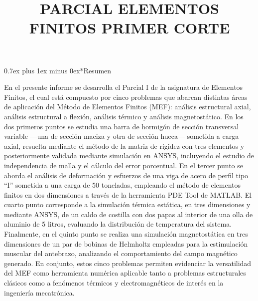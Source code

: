 \documentclass[conference]{IEEEtran}
\makeatletter
\def\section{\@startsection{section}{1}{\z@}{1.5ex plus 1.5ex minus 0.5ex}%
{0.7ex plus 1ex minus 0ex}{\normalfont\large\bfseries\centering\scshape}}%
\makeatother
\begin{document}
\title{
PARCIAL ELEMENTOS FINITOS PRIMER CORTE
}

\author{

\and
{}
\and
{}
}

\maketitle
\thispagestyle{headings}

\section*{Resumen}

En el presente informe se desarrolla el Parcial I de la asignatura de Elementos Finitos, el cual está compuesto por cinco problemas que abarcan distintas áreas de aplicación del Método de Elementos Finitos (MEF): análisis estructural axial, análisis estructural a flexión, análisis térmico y análisis magnetostático. En los dos primeros puntos se estudia una barra de hormigón de sección transversal variable —una de sección maciza y otra de sección hueca— sometida a carga axial, resuelta mediante el método de la matriz de rigidez con tres elementos y posteriormente validada mediante simulación en ANSYS, incluyendo el estudio de independencia de malla y el cálculo del error porcentual. En el tercer punto se aborda el análisis de deformación y esfuerzos de una viga de acero de perfil tipo ``I'' sometida a una carga de 50 toneladas, empleando el método de elementos finitos en dos dimensiones a través de la herramienta PDE Tool de MATLAB. El cuarto punto corresponde a la simulación térmica estática, en tres dimensiones y mediante ANSYS, de un caldo de costilla con dos papas al interior de una olla de aluminio de 5 litros, evaluando la distribución de temperatura del sistema. Finalmente, en el quinto punto se realiza una simulación magnetostática en tres dimensiones de un par de bobinas de Helmholtz empleadas para la estimulación muscular del antebrazo, analizando el comportamiento del campo magnético generado. En conjunto, estos cinco problemas permiten evidenciar la versatilidad del MEF como herramienta numérica aplicable tanto a problemas estructurales clásicos como a fenómenos térmicos y electromagnéticos de interés en la ingeniería mecatrónica.
\end{document}
